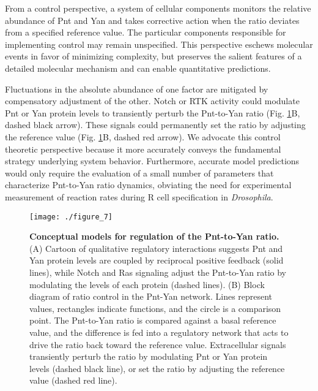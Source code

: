 From a control perspective, a system of cellular components monitors the relative abundance of Pnt and Yan and takes corrective action when the ratio deviates from a specified reference value. The particular components responsible for implementing control may remain unspecified. This perspective eschews molecular events in favor of minimizing complexity, but preserves the salient features of a detailed molecular mechanism and can enable quantitative predictions.

Fluctuations in the absolute abundance of one factor are mitigated by compensatory adjustment of the other. Notch or RTK activity could modulate Pnt or Yan protein levels to transiently perturb the Pnt-to-Yan ratio (Fig. \ref{fig:ratio:fig7}B, dashed black arrow). These signals could permanently set the ratio by adjusting the reference value (Fig. \ref{fig:ratio:fig7}B, dashed red arrow). We advocate this control theoretic perspective because it more accurately conveys the fundamental strategy underlying system behavior. Furthermore, accurate model predictions would only require the evaluation of a small number of parameters that characterize Pnt-to-Yan ratio dynamics, obviating the need for experimental measurement of reaction rates during R cell specification in \textit{Drosophila}.

\begin{figure}[h!]
\centering
\texttt{[image: ./figure\_7]}
\caption[Conceptual models for regulation of the Pnt-to-Yan ratio.]{\textbf{Conceptual models for regulation of the Pnt-to-Yan ratio.} (A) Cartoon of qualitative regulatory interactions suggests Pnt and Yan protein levels are coupled by reciprocal positive feedback (solid lines), while Notch and Ras signaling adjust the Pnt-to-Yan ratio by modulating the levels of each protein (dashed lines). (B) Block diagram of ratio control in the Pnt-Yan network. Lines represent values, rectangles indicate functions, and the circle is a comparison point. The Pnt-to-Yan ratio is compared against a basal reference value, and the difference is fed into a regulatory network that acts to drive the ratio back toward the reference value. Extracellular signals transiently perturb the ratio by modulating Pnt or Yan protein levels (dashed black line), or set the ratio by adjusting the reference value (dashed red line).}
\label{fig:ratio:fig7}
\end{figure}

